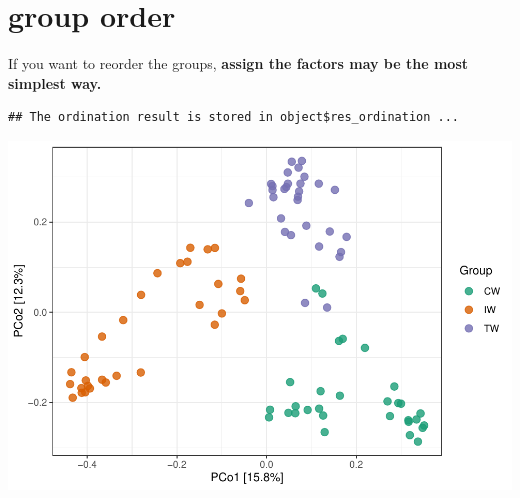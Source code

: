 \documentclass[
]{book}
\newenvironment{Shaded}{\begin{snugshade}}{\end{snugshade}}
\newcommand{\AttributeTok}[1]{\textcolor[rgb]{0.77,0.63,0.00}{#1}}
\newcommand{\FunctionTok}[1]{\textcolor[rgb]{0.00,0.00,0.00}{#1}}
\newcommand{\NormalTok}[1]{#1}
\newcommand{\OtherTok}[1]{\textcolor[rgb]{0.56,0.35,0.01}{#1}}
\newcommand{\SpecialCharTok}[1]{\textcolor[rgb]{0.00,0.00,0.00}{#1}}
\newcommand{\StringTok}[1]{\textcolor[rgb]{0.31,0.60,0.02}{#1}}
\begin{document}
\hypertarget{group-order}{%
\section{group order}\label{group-order}}

If you want to reorder the groups, \textbf{assign the factors may be the most simplest way.}

\begin{Shaded}
\end{Shaded}

\begin{verbatim}
## The ordination result is stored in object$res_ordination ...
\end{verbatim}

\begin{Shaded}
\end{Shaded}

\includegraphics{microeco-tutorial_files/figure-latex/unnamed-chunk-286-1.pdf}
\end{document}
